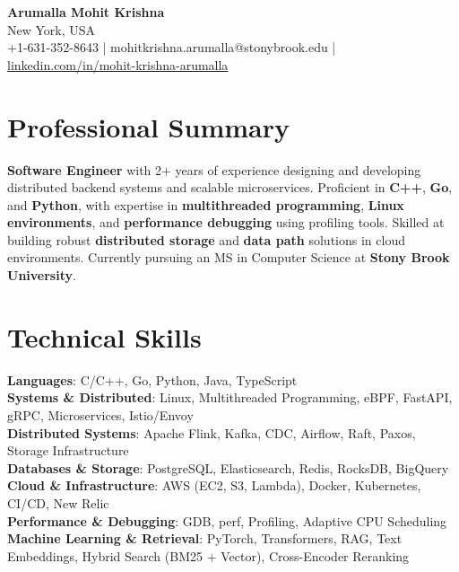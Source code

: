 \documentclass[letterpaper,11pt]{article}
\begin{document}
\begin{center}
  {\Large \textbf{Arumalla Mohit Krishna}} \\
  New York, USA \\
  +1-631-352-8643 \enspace | \enspace mohitkrishna.arumalla@stonybrook.edu \enspace | \enspace \href{https://www.linkedin.com/in/mohit-krishna-arumalla}{linkedin.com/in/mohit-krishna-arumalla}
\end{center}

\section{Professional Summary}
  \begin{itemize}[leftmargin=0.15in, label={}]
    \small{\item{
     \textbf{Software Engineer} with 2+ years of experience designing and developing distributed backend systems and scalable microservices. Proficient in \textbf{C++}, \textbf{Go}, and \textbf{Python}, with expertise in \textbf{multithreaded programming}, \textbf{Linux environments}, and \textbf{performance debugging} using profiling tools. Skilled at building robust \textbf{distributed storage} and \textbf{data path} solutions in cloud environments. Currently pursuing an MS in Computer Science at \textbf{Stony Brook University}.
    }}
  \end{itemize}
\vspace{-16pt}

\section{Technical Skills}
 \begin{itemize}[leftmargin=0.15in, label={}]
    \small{\item{
     \textbf{Languages}: C/C++, Go, Python, Java, TypeScript \\
     \textbf{Systems \& Distributed}: Linux, Multithreaded Programming, eBPF, FastAPI, gRPC, Microservices, Istio/Envoy \\
     \textbf{Distributed Systems}: Apache Flink, Kafka, CDC, Airflow, Raft, Paxos, Storage Infrastructure \\
     \textbf{Databases \& Storage}: PostgreSQL, Elasticsearch, Redis, RocksDB, BigQuery \\
     \textbf{Cloud \& Infrastructure}: AWS (EC2, S3, Lambda), Docker, Kubernetes, CI/CD, New Relic \\
     \textbf{Performance \& Debugging}: GDB, perf, Profiling, Adaptive CPU Scheduling \\
     \textbf{Machine Learning \& Retrieval}: PyTorch, Transformers, RAG, Text Embeddings, Hybrid Search (BM25 + Vector), Cross-Encoder Reranking
    }}
 \end{itemize}
\vspace{-16pt}
\end{document}
